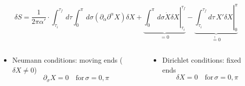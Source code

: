 \documentclass[aspectratio=169]{beamer}
\begin{document}
\begin{frame}
\begin{columns}
\begin{column}{0.4\textwidth}
			\end{column}
		\end{columns}
		\begin{equation*}
			\delta S = \frac{1}{2\pi\alpha'} \cdot \int_{\tau_i}^{\tau_f} \, d\tau \int_{0}^{\pi}\, d\sigma (\partial_\alpha \partial^\alpha X)\delta X + \underbrace{\left.\int_{0}^{\pi} \, d\sigma \dot{X} \delta X\right|^{\tau_f}_{\tau_i}}_{ = 0 } - \underbrace{ \left. \int_{\tau_i}^{\tau_f} d\tau \, X' \delta X \right|^\pi_0}_{\stackrel{!}{=} 0 }
		\end{equation*}
		\begin{columns}
			\begin{column}{0.6\textwidth}
		\begin{itemize}
			\item Neumann conditions: moving ends ($\delta X \neq 0$)
				\begin{equation*}
					\partial_\sigma X  = 0 \quad \text{for} \, \sigma = 0,\pi
				\end{equation*}
		\end{itemize}
		\end{column}
		\begin{column}{0.4\textwidth}
			\begin{itemize}
				\item Dirichlet conditions: fixed ends
			\begin{equation*}
				\delta X  = 0 \quad \text{for} \, \sigma = 0,\pi
			\end{equation*}
		\end{itemize}
		\end{column}
		\end{columns}
	\end{frame}
\end{document}
